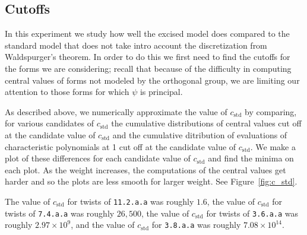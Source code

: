 \documentclass[11pt]{amsart}
\newcommand{\std}{\textrm{std}}
\begin{document}
\subsection{Cutoffs}  In this experiment we study how well the excised model does compared to the standard model that does not take intro account the discretization from Waldspurger's theorem.  In order to do this we first need to find the cutoffs for the forms we are considering; recall that because of the difficulty in computing central values of forms not modeled by the orthogonal group, we are limiting our attention to those forms for which $\psi$ is principal.

As described above, we numerically approximate the value of $c_\std$ by comparing, for various candidates of $c_\std$ the cumulative distributions of central values cut off at the candidate value of $c_\std$ and the cumulative ditribution of evaluations of characteristic polynomials at 1 cut off at the candidate value of $c_\std$.  We make a plot of these differences for each candidate value of $c_\std$ and find the minima on each plot.  As the weight increases, the computations of the central values get harder and so the plots are less smooth for larger weight.  See Figure~\ref{fig:c_std}.  

The value of $c_\std$ for twists of \texttt{11.2.a.a} was roughly $1.6$, the value of $c_\std$ for twists of \texttt{7.4.a.a} was roughly $26,500$, the value of $c_\std$ for twists of \texttt{3.6.a.a} was roughly $2.97\times 10^9$, and the value of $c_\std$ for \texttt{3.8.a.a} was roughly $7.08\times 10^{14}$.   
\end{document}
